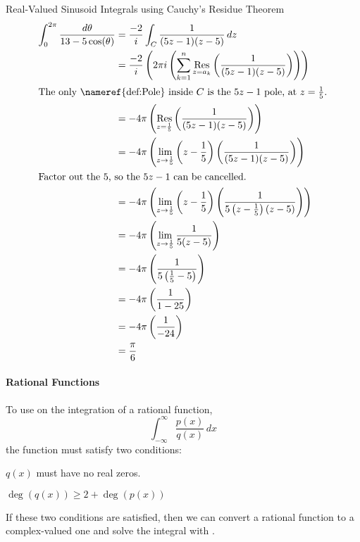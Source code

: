 \begin{example}{Real-Valued Sinusoid Integrals using Cauchy's Residue Theorem}
  \begin{align*}
    \int_{0}^{2\pi} \frac{d\theta}{13 - 5\cos(\theta)} &= \frac{-2}{i} \int_{C} \frac{1}{(5z-1) (z-5)} \, dz \\
                                                       &= \frac{-2}{i} \left( 2 \pi i \left( \sum_{k=1}^{n} \Residue{\frac{1}{(5z-1) (z-5)}}{z=a_{k}} \right) \right) \\
    \intertext{The only \nameref{def:Pole} inside $C$ is the $5z-1$ pole, at $z = \frac{1}{5}$.}
                                                       &= -4 \pi \left( \Residue{\frac{1}{(5z-1) (z-5)}}{z=\frac{1}{5}} \right) \\
                                                       &= -4 \pi \left( \lim\limits_{z \to \frac{1}{5}} \left( z-\frac{1}{5} \right) \left( \frac{1}{(5z-1) (z-5)} \right) \right) \\
    \shortintertext{Factor out the $5$, so the $5z-1$ can be cancelled.}
                                                       &= -4 \pi \left( \lim\limits_{z \to \frac{1}{5}} \left( z-\frac{1}{5} \right) \left( \frac{1}{5 \left( z-\frac{1}{5} \right) (z-5)} \right) \right) \\
                                                       &= -4 \pi \left( \lim\limits_{z \to \frac{1}{5}} \frac{1}{5(z-5)} \right) \\
                                                       &= -4 \pi \left( \frac{1}{5 \left( \frac{1}{5} - 5 \right)} \right) \\
                                                       &= -4 \pi \left( \frac{1}{1-25} \right) \\
                                                       &= -4 \pi \left(\frac{1}{-24} \right) \\
                                                       &= \frac{\pi}{6}
  \end{align*}
\end{example}

\paragraph{Rational Functions}\label{par:Rational_Functions_Cauchys_Residue_Theorem}
To use  on the integration of a rational function,
\begin{equation*}
  \int_{-\infty}^{\infty} \frac{p(x)}{q(x)} \, dx
\end{equation*}
the function must satisfy two conditions:
\begin{propertylist}
\item $q(x)$ must have no real zeros.
\item $\deg(q(x)) \geq 2 + \deg(p(x))$
\end{propertylist}

If these two conditions are satisfied, then we can convert a rational function to a complex-valued one and solve the integral with .


